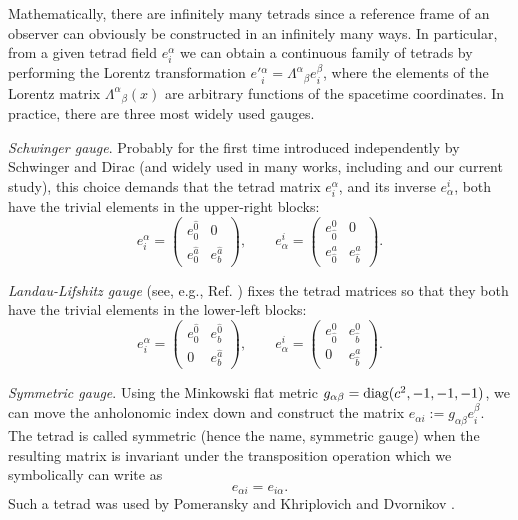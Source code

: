 \documentclass[preprint,showpacs,preprintnumbers,amsmath,amssymb]{revtex4}
\begin{document}
Mathematically, there are infinitely many tetrads since a reference frame
of an observer can obviously be constructed in an infinitely many ways.
In particular, {}from a given tetrad field $e{}^\alpha_i$ we can obtain
a continuous family of tetrads by performing the Lorentz transformation
$e'{}^\alpha_i = \Lambda^\alpha{}_\beta e^\beta_i$, where the elements of
the Lorentz matrix $\Lambda^\alpha{}_\beta(x)$ are arbitrary functions of the
spacetime coordinates. In practice, there are three most widely used gauges.

{\it Schwinger gauge}. Probably for the first time introduced independently
by Schwinger \cite{Schwinger} and Dirac \cite{dirac} (and widely used in many
works, including \cite{HN} and our current study), this choice demands that
the tetrad matrix $e^\alpha_i$, and its inverse $e^i_\alpha$, both have the
trivial elements in the upper-right blocks:
\begin{equation}\label{Sgauge}
e^\alpha_i = \left(\begin{array}{c|c} e^{\widehat 0}_0 & 0 \\
\hline e^{\widehat a}_0 & e^{\widehat a}_b\end{array}\right),\qquad
e_\alpha^i = \left(\begin{array}{c|c} e_{\widehat 0}^0 & 0 \\
\hline e^a_{\widehat 0} & e_{\widehat b}^a\end{array}\right).
\end{equation}

{\it Landau-Lifshitz gauge} (see, e.g., Ref. \cite{LLp}) fixes the
tetrad matrices so that they both have the trivial elements in the
lower-left blocks:
\begin{equation}\label{Lgauge}
e^\alpha_i = \left(\begin{array}{c|c} e^{\widehat 0}_0 & e^{\widehat 0}_b \\
\hline 0 & e^{\widehat a}_b\end{array}\right),\qquad
e_\alpha^i = \left(\begin{array}{c|c} e_{\widehat 0}^0 & e^0_{\widehat b} \\
\hline 0 & e_{\widehat b}^a\end{array}\right).
\end{equation}

{\it Symmetric gauge}. Using the Minkowski flat metric $g_{\alpha\beta} =
{\rm diag}(c^2, -1, -1, -1)$, we can move the anholonomic index down and
construct the matrix $e_{\alpha i} := g_{\alpha\beta}e^\beta_i$. The tetrad
is called symmetric  (hence the name, symmetric gauge) when the resulting
matrix is invariant under the transposition operation which we symbolically
can write as
\begin{equation}
e_{\alpha i} = e_{i\alpha}.\label{Kgauge}
\end{equation}
Such a tetrad was used by Pomeransky and Khriplovich \cite{PK} and Dvornikov
\cite{Dvornikov}.
\end{document}

